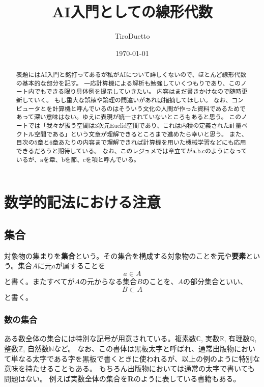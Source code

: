 \documentclass[10pt]{jsarticle}
\title{AI入門としての線形代数}
\author{TiroDuetto}
\date{\today}
\theoremstyle{definition}%
\numberwithin{equation}{section}%
\begin{document}
\maketitle

\begin{abstract}
表題にはAI入門と銘打ってあるが私がAIについて詳しくないので、ほとんど線形代数の基本的な部分を記す。
一応計算機による解析も勉強していくつもりであり、このノート内でもできる限り具体例を提示していきたい。
内容はまだ書きかけなので随時更新していく。
もし重大な誤植や論理の間違いがあれば指摘してほしい。
なお、コンピュータとを計算機と呼んでいるのはそういう文化の人間が作った資料であるためであって深い意味はない。ゆえに表現が統一されていないところもあると思う。
このノートでは「我々が扱う空間は3次元Euclid空間であり、これは内積の定義された計量ベクトル空間である」という文章が理解できるところまで進めたら幸いと思う。
また、目次の5章と6章あたりの内容まで理解できれば計算機を用いた機械学習などにも応用できるだろうと期待している。
なお、このレジュメでは章立てがa.b.cのようになっているが、aを章、bを節、cを項と呼んでいる。
\end{abstract}
\tableofcontents
\setcounter{section}{-1}
\section{数学的記法における注意}
\subsection{集合}
対象物の集まりを{\bf 集合}という。その集合を構成する対象物のことを{\bf 元}や{\bf 要素}という。集合$A$に元$a$が属することを
\begin{equation}
  a \in A 
\end{equation}
と書く。またすべてが$A$の元からなる集合$B$のことを、$A$の部分集合といい、
\begin{equation}
  B \subset A
\end{equation}
と書く。
\subsubsection{数の集合}
ある数全体の集合には特別な記号が用意されている。複素数$\mathbb{C}$, 実数$\mathbb{R}$, 有理数$\mathbb{Q}$, 整数$\mathbb{Z}$, 自然数$\mathbb{N}$など。
なお、この書体は黒板太字と呼ばれ、通常出版物において単なる太字である字を黒板で書くときに使われるが、以上の例のように特別な意味を持たせることもある。
もちろん出版物においては通常の太字で書いても問題はない。
例えば実数全体の集合を{\bf R}のように表している書籍もある。
\end{document}
